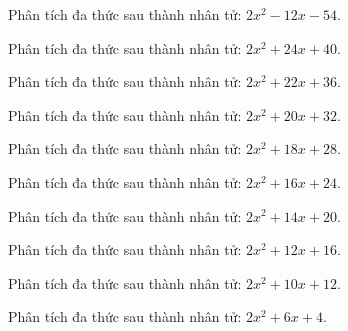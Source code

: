 \begin{bt}
	Phân tích đa thức sau thành nhân tử: $2 x^2 - 12 x - 54$.
\end{bt}
\begin{bt}
	Phân tích đa thức sau thành nhân tử: $2 x^2 + 24 x + 40$.
\end{bt}
\begin{bt}
	Phân tích đa thức sau thành nhân tử: $2 x^2 + 22 x + 36$.
\end{bt}
\begin{bt}
	Phân tích đa thức sau thành nhân tử: $2 x^2 + 20 x + 32$.
\end{bt}
\begin{bt}
	Phân tích đa thức sau thành nhân tử: $2 x^2 + 18 x + 28$.
\end{bt}
\begin{bt}
	Phân tích đa thức sau thành nhân tử: $2 x^2 + 16 x + 24$.
\end{bt}
\begin{bt}
	Phân tích đa thức sau thành nhân tử: $2 x^2 + 14 x + 20$.
\end{bt}
\begin{bt}
	Phân tích đa thức sau thành nhân tử: $2 x^2 + 12 x + 16$.
\end{bt}
\begin{bt}
	Phân tích đa thức sau thành nhân tử: $2 x^2 + 10 x + 12$.
\end{bt}
\begin{bt}
	Phân tích đa thức sau thành nhân tử: $2 x^2 + 6 x + 4$.
\end{bt}
